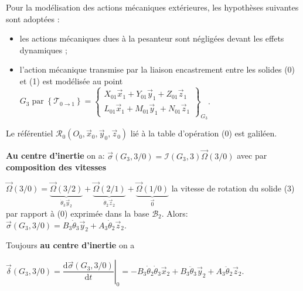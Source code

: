 
Pour la modélisation des actions mécaniques extérieures, les hypothèses suivantes sont adoptées :

\begin{itemize}
  \item les actions mécaniques dues à la pesanteur sont négligées devant les effets dynamiques ;

  \item l'action mécanique transmise par la liaison encastrement entre les solides (0) et (1) est modélisée au point $G_{3} \operatorname{par}\left\{\mathcal{T}_{0 \rightarrow 1}\right\}=\left\{\begin{array}{c}X_{01} \vec{x}_{1}+Y_{01} \vec{y}_{1}+Z_{01} \vec{z}_{1} \\ L_{01} \vec{x}_{1}+M_{01} \vec{y}_{1}+N_{01} \vec{z}_{1}\end{array}\right\}_{G_{3}}$.

\end{itemize}

Le référentiel $\mathcal{R}_{0}\left(O_{0}, \vec{x}_{0}, \vec{y}_{0}, \vec{z}_{0}\right)$ lié à la table d'opération (0) est galiléen.
\fi

\ifprof
\begin{corrige}

\textbf{Au centre d'inertie} on a: $\overrightarrow{\sigma}(G_3,3/0) = \mathcal{I}(G_3,3)\overrightarrow{\Omega}(3/0)$ avec par \textbf{composition des vitesses} 

$\overrightarrow{\Omega}(3/0) = \underbrace{\overrightarrow{\Omega}(3/2)}_{\dot{\theta}_3 \overrightarrow{y}_2} + \underbrace{\overrightarrow{\Omega}(2/1)}_{\dot{\theta}_2\overrightarrow{z}_2} + \underbrace{\overrightarrow{\Omega}(1/0)}_{\overrightarrow{0}}$  la vitesse de rotation du solide (3) par rapport à (0) exprimée dans la base $\mathcal{B}_2$. Alors: $\boxed{\overrightarrow{\sigma}(G_3,3/0) = B_3\dot{\theta}_3\overrightarrow{y}_2 + A_3\dot{\theta}_2\overrightarrow{z}_2}$.
\end{corrige}
\else
\fi

\ifprof
\begin{corrige}
Toujours \textbf{au centre d'inertie} on a 

$\boxed{\overrightarrow{\delta}(G_3,3/0) = \left. \dfrac{\mathrm{d}\overrightarrow{\sigma}(G_3,3/0)}{\mathrm{d}t} \right|_{0} = -B_3\dot{\theta}_2\dot{\theta}_3\overrightarrow{x}_2 + B_3 \ddot{\theta}_3\overrightarrow{y}_2 + A_3\ddot{\theta}_{2}\overrightarrow{z}_2}$. 
\end{corrige}
\else
\fi

